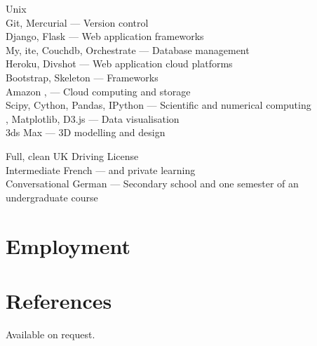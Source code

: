 \documentclass[10pt]{article}
\begin{document}
        {
            Unix\\
            Git, Mercurial --- Version control\\
            Django, Flask --- Web application frameworks\\
            My, ite, Couchdb, Orchestrate --- Database management\\
            Heroku, Divshot --- Web application cloud platforms\\
            Bootstrap, Skeleton ---  Frameworks\\
            Amazon ,  --- Cloud computing and storage\\
            Scipy, Cython, Pandas, IPython --- Scientific and numerical computing\\
            , Matplotlib, D3.js --- Data visualisation\\
            3ds Max --- 3D modelling and design
        }

        {
            Full, clean UK Driving License\\
            Intermediate French ---   and private learning\\
            Conversational German --- Secondary school and one semester of an undergraduate course\\
        }

    \section{Employment}




    \section{References}

        Available on request.
\end{document}
